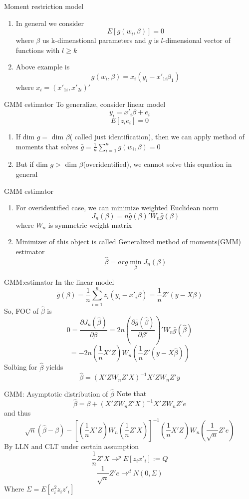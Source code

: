 \documentclass{beamer}
\begin{document}
\begin{frame}{Moment restriction model}
	\begin{enumerate}
\item In general we consider	
\[E[g(w_i,\beta)]=0\]
where $\beta$ us k-dimenstional parameters and $g$ is $l$-dimensional vector of functions with $l \geq k$ 
\item Above example is 
	\[g(w_i,\beta) = x_i(y_i - x'_{1i} \beta_1)\]
	where $x_i = (x'_{1i}, x'_{2i})'$
\end{enumerate}
\end{frame}
\begin{frame}{GMM estimator}
	To generalize, consider linear model
	\[y_i = x'_i \beta + e_i\]
	\[E[z_i e_i] = 0\]
\begin{enumerate}
	\item If dim $g= $  dim $\beta$( called just identification), then we can apply method of moments that solves $\bar{g} = \frac{1}{n} \sum^n_{i=1} g(w_i,\beta) = 0$
	\item But if dim $g > $ dim $\beta $(overidentified), we cannot solve this equation in general
\end{enumerate}
\end{frame}
\begin{frame}{GMM estimator}
	\begin{enumerate}
	\item For overidentified case, we can minimize weighted Euclidean norm
	\[J_n(\beta) = n\bar{g}(\beta)' W_n \bar{g}(\beta)\]
where $W_n$ is symmetric weight matrix
	\item Minimizer of this object is called Generalized method of moments(GMM) estimator
		\[\hat{\beta} = arg \min_{\beta} J_n(\beta)\]
	\end{enumerate}
\end{frame}
\begin{frame}{GMM:estimator}
	In the linear model
	\[\bar{g}(\beta) = \frac{1}{n} \sum^n_{i=1} z_i (y_i - x'_i \beta) = \frac{1}{n} Z'(y-X\beta)\]
	So, FOC of $\hat{\beta}$ is 
	\[0 = \frac{\partial J_n(\hat{\beta})}{\partial \beta} = 2n (\frac{\partial \bar{g}(\hat{\beta})}{\partial \beta'})' W_n \bar{g}(\hat{\beta})\]
	\[= -2n(\frac{1}{n} X' Z) W_n (\frac{1}{n} Z'(y - X \hat{\beta}))\]
	Solbing for $\hat{\beta}$ yields
	\[\hat{\beta} = (X'ZW_n Z' X)^{-1} X'ZW_nZ'y\]
\end{frame}
\begin{frame}{GMM: Asymptotic distribution of $\hat{\beta}$}
	Note that 
	\[\hat{\beta} = \beta + (X'ZW_n Z' X)^{-1} X'ZW_nZ' e\]
	and thus
	\[\sqrt{n} (\hat{\beta} - \beta) - [(\frac{1}{n} X' Z) W_n (\frac{1}{n} Z'X)]^{-1} (\frac{1}{n} X'Z) W_n (\frac{1}{\sqrt{n}} Z' e)\]
	By LLN and CLT under certain assumption
	\[\frac{1}{n} Z'X \rightarrow^p E[z_ix'_i] :=Q\]
	\[\frac{1}{\sqrt{n}} Z'e \rightarrow^d N(0, \Sigma)\]
	Where $\Sigma = E[e^2_i z_i z'_i]$
\end{frame}
\end{document}
